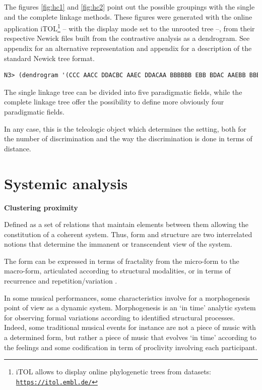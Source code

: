 The figures \ref{fig:hc1} and \ref{fig:hc2} point out the possible groupings with the single and the complete linkage methods. These figures were generated with the online application iTOL\footnote{iTOL allows to display online phylogenetic trees from datasets:\\ \indent \href{https://itol.embl.de/}{\scriptsize{\texttt{https://itol.embl.de/}}}} -- with the display mode set to the unrooted tree --,
from their respective Newick files built from the contrastive analysis as a dendrogram. See appendix  for an alternative representation and appendix  for a description of the standard Newick tree format.

\smallskip
 
\begin{lstlisting}[language=Lisp]
N3> (dendrogram '(CCC AACC DDACBC AAEC DDACAA BBBBBB EBB BDAC AAEBB BBB EE BBBBACDEAAEAA CBB BBEAA AABBAD ABCC ACEC DDACDBAE CDAA ABBEAAEBAD AE DEAA EAD DC CBE ABBC EBD ABDAA EBAA ABBEAABC DBB) 1|2)     
\end{lstlisting}

The single linkage tree can be divided into five paradigmatic fields, while the complete linkage tree offer the possibility to define more obviously four paradigmatic fields. 

In any case, this is the teleologic object which determines the setting, both for the number of discrimination and the way the discrimination is done in terms of distance.

\section{Systemic analysis}

\textbf{Clustering proximity}
\smallskip

Defined as a set of relations that maintain elements between them allowing the constitution of a coherent system. Thus, form and structure are two interrelated notions that determine the immanent or transcendent view of the system.

\smallskip

The form can be expressed in terms of fractality from the micro-form to the macro-form, articulated according to structural modalities, or in terms of recurrence and repetition/variation  \citep{afum}.

In some musical performances, some characteristics involve for a morphogenesis point of view as a dynamic system. Morphogenesis is an `in time' analytic system for observing formal variations according to identified structural processes. Indeed, some traditional musical events for instance are not a piece of music with a determined form, but rather a piece of music that evolves `in time' according to the feelings and some codification in term of proclivity involving each participant.

